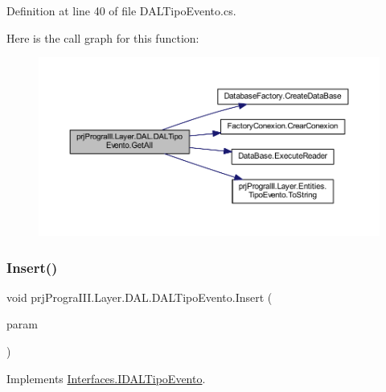 Definition at line 40 of file D\+A\+L\+Tipo\+Evento.\+cs.

Here is the call graph for this function\+:
\nopagebreak
\begin{figure}[H]
\begin{center}
\leavevmode
\includegraphics[width=350pt]{classprj_progra_i_i_i_1_1_layer_1_1_d_a_l_1_1_d_a_l_tipo_evento_afc72a91b1a8484b317932a6f01c42815_cgraph}
\end{center}
\end{figure}
\hypertarget{classprj_progra_i_i_i_1_1_layer_1_1_d_a_l_1_1_d_a_l_tipo_evento_a890327fb7a414d8f67033f6036227418}{}\label{classprj_progra_i_i_i_1_1_layer_1_1_d_a_l_1_1_d_a_l_tipo_evento_a890327fb7a414d8f67033f6036227418} 
\subsubsection{\texorpdfstring{Insert()}{Insert()}}
{\footnotesize\ttfamily void prj\+Progra\+I\+I\+I.\+Layer.\+D\+A\+L.\+D\+A\+L\+Tipo\+Evento.\+Insert (\begin{DoxyParamCaption}\item[{\hyperlink{classprj_progra_i_i_i_1_1_layer_1_1_entities_1_1_tipo_evento}{Tipo\+Evento}}]{param }\end{DoxyParamCaption})}



Implements \hyperlink{interface_interfaces_1_1_i_d_a_l_tipo_evento_ac9cd8048199f2db94302ae677629a531}{Interfaces.\+I\+D\+A\+L\+Tipo\+Evento}.



